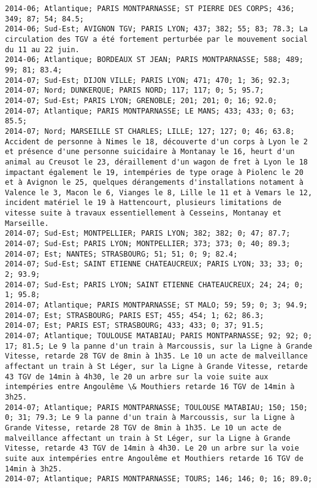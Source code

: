 \documentclass{article}
\begin{document}
\begin{Verbatim}[commandchars=\\\{\}]
2014-06; Atlantique; PARIS MONTPARNASSE; ST PIERRE DES CORPS; 436; 349; 87; 54; 84.5; 
2014-06; Sud-Est; AVIGNON TGV; PARIS LYON; 437; 382; 55; 83; 78.3; La circulation des TGV a été fortement perturbée par le mouvement social du 11 au 22 juin.
2014-06; Atlantique; BORDEAUX ST JEAN; PARIS MONTPARNASSE; 588; 489; 99; 81; 83.4; 
2014-07; Sud-Est; DIJON VILLE; PARIS LYON; 471; 470; 1; 36; 92.3; 
2014-07; Nord; DUNKERQUE; PARIS NORD; 117; 117; 0; 5; 95.7; 
2014-07; Sud-Est; PARIS LYON; GRENOBLE; 201; 201; 0; 16; 92.0; 
2014-07; Atlantique; PARIS MONTPARNASSE; LE MANS; 433; 433; 0; 63; 85.5; 
2014-07; Nord; MARSEILLE ST CHARLES; LILLE; 127; 127; 0; 46; 63.8; Accident de personne à Nimes le 18, découverte d'un corps à Lyon le 2 et présence d'une personne suicidaire à Montanay le 16, heurt d'un animal au Creusot le 23, déraillement d'un wagon de fret à Lyon le 18 impactant également le 19, intempéries de type orage à Piolenc le 20 et à Avignon le 25, quelques dérangements d'installations notament à Valence le 3, Macon le 6, Vianges le 8, Lille le 11 et à Vemars le 12, incident matériel le 19 à Hattencourt, plusieurs limitations de vitesse suite à travaux essentiellement à Cesseins, Montanay et Marseille.
2014-07; Sud-Est; MONTPELLIER; PARIS LYON; 382; 382; 0; 47; 87.7; 
2014-07; Sud-Est; PARIS LYON; MONTPELLIER; 373; 373; 0; 40; 89.3; 
2014-07; Est; NANTES; STRASBOURG; 51; 51; 0; 9; 82.4; 
2014-07; Sud-Est; SAINT ETIENNE CHATEAUCREUX; PARIS LYON; 33; 33; 0; 2; 93.9; 
2014-07; Sud-Est; PARIS LYON; SAINT ETIENNE CHATEAUCREUX; 24; 24; 0; 1; 95.8; 
2014-07; Atlantique; PARIS MONTPARNASSE; ST MALO; 59; 59; 0; 3; 94.9; 
2014-07; Est; STRASBOURG; PARIS EST; 455; 454; 1; 62; 86.3; 
2014-07; Est; PARIS EST; STRASBOURG; 433; 433; 0; 37; 91.5; 
2014-07; Atlantique; TOULOUSE MATABIAU; PARIS MONTPARNASSE; 92; 92; 0; 17; 81.5; Le 9 la panne d'un train à Marcoussis, sur la Ligne à Grande Vitesse, retarde 28 TGV de 8min à 1h35. Le 10 un acte de malveillance affectant un train à St Léger, sur la Ligne à Grande Vitesse, retarde 43 TGV de 14min à 4h30, le 20 un arbre sur la voie suite aux intempéries entre Angoulême \& Mouthiers retarde 16 TGV de 14min à 3h25.
2014-07; Atlantique; PARIS MONTPARNASSE; TOULOUSE MATABIAU; 150; 150; 0; 31; 79.3; Le 9 la panne d'un train à Marcoussis, sur la Ligne à Grande Vitesse, retarde 28 TGV de 8min à 1h35. Le 10 un acte de malveillance affectant un train à St Léger, sur la Ligne à Grande Vitesse, retarde 43 TGV de 14min à 4h30. Le 20 un arbre sur la voie suite aux intempéries entre Angoulême et Mouthiers retarde 16 TGV de 14min à 3h25.
2014-07; Atlantique; PARIS MONTPARNASSE; TOURS; 146; 146; 0; 16; 89.0; 

\end{Verbatim}
\end{document}
